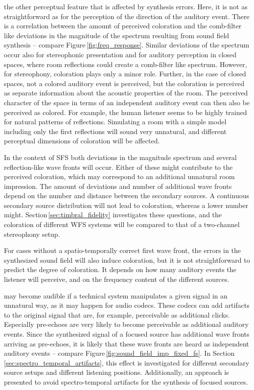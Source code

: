  the other perceptual feature that is affected by
synthesis errors. Here, it is not as straightforward as for
the perception of the direction of the auditory event. There is
a correlation between the amount of perceived coloration and the
comb-filter like deviations in the magnitude of the
spectrum resulting from sound field synthesis -- compare
Figure\,\ref{fig:freq_response}. Similar deviations of the spectrum occur
also for stereophonic presentation and for auditory
perception in closed spaces, where room reflections could create a comb-filter
like spectrum. However, for stereophony, coloration plays only a minor
role.\autocite{Pulkki2001b} Further, in the case of closed spaces, not a colored
auditory event is perceived, but the coloration is perceived as separate
information about the acoustic properties of the room.
The perceived character of the space in terms of an independent
auditory event can then also be
perceived as colored. For example, the human listener seems to be
highly trained for natural patterns of reflections. Simulating a room
with a simple model including only the first reflections will sound
very unnatural, and different perceptual dimensions of coloration will be affected.

In the context of \ac{SFS} both deviations in the magnitude spectrum and
several reflection-like wave fronts will occur. Either of these might contribute
to the perceived coloration, which may correspond to an additional unnatural 
room impression. The amount of deviations and number of additional wave
fronts depend on the number and distance between the secondary sources. A
continuous secondary source distribution will not lead to coloration,
whereas a lower number might.
Section\,\ref{sec:timbral_fidelity} investigates these questions, and
the coloration of different \ac{WFS} systems will be compared to that of a two-channel
stereophony setup.

For cases without a spatio-temporally correct first wave front, the errors in the
synthesized sound field will also induce coloration, but it
is not straightforward to predict the degree of coloration. It depends on how many auditory events
the listener will perceive, and on the frequency content of the different
sources.


 may become audible if a technical system
manipulates a given signal in an unnatural way, as it may happen for
audio codecs. These codecs can add artifacts to the original signal
that are, for example, perceivable as additional clicks.
Especially pre-echoes are very likely to become
perceivable as additional auditory events. Since the synthesized signal of a
focused source has additional wave fronts arriving as pre-echoes, it is likely
that these wave fronts are heard as independent auditory events -- compare
Figure\,\ref{fig:sound_field_imp_fixed_fs}.
In Section\,\ref{sec:spectro_temporal_artifacts}, this effect is investigated for
different secondary source setups and different listening positions.
Additionally, an approach is presented to avoid spectro-temporal artifacts
for the synthesis of focused sources.

